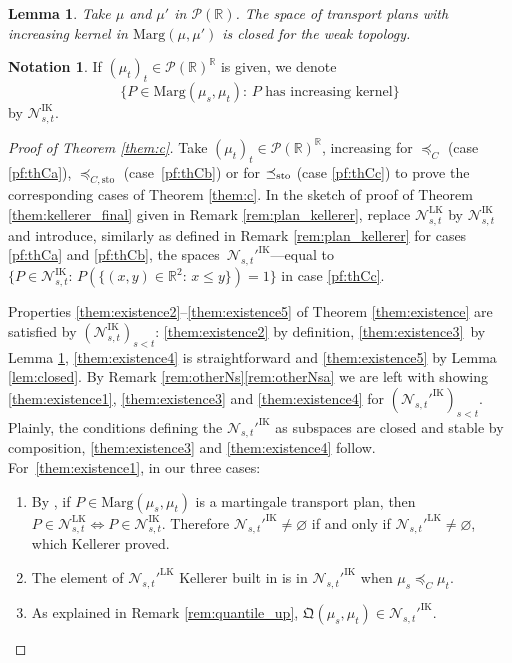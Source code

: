 \documentclass[JEP,XML,SOM,Unicode,NoEqCountersInSection,NoFloatCountersInSection,published]{cedram}
\theoremstyle{plain}
\newtheorem{lem}[them]{Lemma}
\theoremstyle{definition}
\newtheorem{notation}[them]{Notation} %
\newcommand{\como}{\mathfrak{Q}}
\newcommand{\ML}{\mathrm{LK}}
\newcommand{\IT}{\mathrm{IK}}
\newcommand{\p}{\mathcal{P}}
\newcommand{\ma}{\mathrm{Marg}}
\newcommand{\R}{\mathbb{R}}
\newcommand{\sto}{\mathrm{sto}}
\newcommand{\leqc}{\preceq_{C}}
\newcommand{\leqcs}{\preceq_{C,\sto}}
\newcommand{\leqs}{\preceq_{\text{\rm sto}}}
\begin{document}
\begin{lem}\label{lem:transitions_croissantes_limite} Take $\mu$ and $\mu'$ in $\p(\R)$. The space of transport plans with increasing kernel in $\ma(\mu,\mu')$ is closed for the weak topology.
\end{lem}

\begin{notation}\label{nota:Nik}If $(\mu_t)_t\in\p(\R)^\R$ is given, we denote
\[
\{P\in\ma(\mu_s,\mu_t):\,P\text{ has increasing kernel}\}
\]
by $\mathcal{N}^\IT_{s,t}$.
\end{notation}

\begin{proof}[Proof of Theorem \ref{them:c}] Take $(\mu_t)_t\in\p(\R)^\R$, increasing for $\leqc$ (case \eqref{pf:thCa}), $\leqcs$ (case~\eqref{pf:thCb}) or for $\leqs$ (case \eqref{pf:thCc}) to prove the corresponding cases of Theorem \ref{them:c}. In the sketch of proof of Theorem \ref{them:kellerer_final} given in Remark \ref{rem:plan_kellerer}, replace $\mathcal{N}^\ML_{s,t}$ by $\mathcal{N}^\IT_{s,t}$ and introduce, similarly as defined in Remark \ref{rem:plan_kellerer} for cases \eqref{pf:thCa} and \eqref{pf:thCb}, the spaces~$\mathcal{N}_{s,t}'^\IT$---equal to
$\{P\in\mathcal{N}^\IT_{s,t}:\,P(\{(x,y)\in\R^2:\,x\leqslant y\})=1\}$ in case \eqref{pf:thCc}.

Properties \eqref{them:existence2}--\eqref{them:existence5} of Theorem \ref{them:existence} are satisfied by $(\mathcal{N}^\IT_{s,t})_{s<t}$: \eqref{them:existence2} by definition, \eqref{them:existence3}~by Lemma \ref{lem:transitions_croissantes_limite}, \eqref{them:existence4} is straightforward and \eqref{them:existence5} by Lemma \ref{lem:closed}. By Remark \ref{rem:otherNs}\eqref{rem:otherNsa} we are left with showing \eqref{them:existence1}, \eqref{them:existence3} and \eqref{them:existence4} for $(\mathcal{N}_{s,t}'^\IT)_{s<t}$. Plainly, the conditions defining the $\mathcal{N}_{s,t}'^\IT$ as subspaces are closed and stable by composition, \eqref{them:existence3} and \eqref{them:existence4} follow. For~\eqref{them:existence1}, in our three cases:
\begin{enumerate}
\item\label{pf:thCa}
By \cite[\S 3.1]{BHS}, if $P\in\ma(\mu_s,\mu_t)$ is a martingale transport plan, then $P\in\mathcal{N}_{s,t}^\ML\Leftrightarrow P\in\mathcal{N}_{s,t}^\IT$. Therefore $\mathcal{N}_{s,t}'^\IT\neq\varnothing$ if and only if $\mathcal{N}_{s,t}'^\ML\neq\varnothing$, which Kellerer proved.

\item\label{pf:thCb}
The element of $\mathcal{N}_{s,t}'^\ML$ Kellerer built in \cite[Def.\,7 \& Th.\,2]{Ke72} is in $\mathcal{N}_{s,t}'^\IT$ when $\mu_s\leqc\mu_t$.

\item\label{pf:thCc}
As explained in Remark \ref{rem:quantile_up}, $\como(\mu_s,\mu_t)\in \mathcal{N}_{s,t}'^\IT$.\qedhere
\end{enumerate}
\end{proof}
\end{document}
